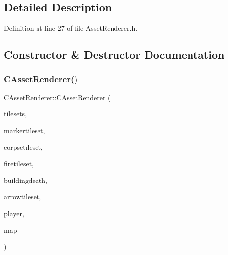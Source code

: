 \subsection{Detailed Description}


Definition at line 27 of file Asset\+Renderer.\+h.



\subsection{Constructor \& Destructor Documentation}
\hypertarget{classCAssetRenderer_a8ac3835671efb08a1793b2fe5af2b187}{}\label{classCAssetRenderer_a8ac3835671efb08a1793b2fe5af2b187} 
\subsubsection{\texorpdfstring{C\+Asset\+Renderer()}{CAssetRenderer()}}
{\footnotesize\ttfamily C\+Asset\+Renderer\+::\+C\+Asset\+Renderer (\begin{DoxyParamCaption}\item[{std\+::vector$<$ std\+::shared\+\_\+ptr$<$ \hyperlink{classCGraphicMulticolorTileset}{C\+Graphic\+Multicolor\+Tileset} $>$ $>$}]{tilesets,  }\item[{std\+::shared\+\_\+ptr$<$ \hyperlink{classCGraphicTileset}{C\+Graphic\+Tileset} $>$}]{markertileset,  }\item[{std\+::shared\+\_\+ptr$<$ \hyperlink{classCGraphicTileset}{C\+Graphic\+Tileset} $>$}]{corpsetileset,  }\item[{std\+::vector$<$ std\+::shared\+\_\+ptr$<$ \hyperlink{classCGraphicTileset}{C\+Graphic\+Tileset} $>$ $>$}]{firetileset,  }\item[{std\+::shared\+\_\+ptr$<$ \hyperlink{classCGraphicTileset}{C\+Graphic\+Tileset} $>$}]{buildingdeath,  }\item[{std\+::shared\+\_\+ptr$<$ \hyperlink{classCGraphicTileset}{C\+Graphic\+Tileset} $>$}]{arrowtileset,  }\item[{std\+::shared\+\_\+ptr$<$ \hyperlink{classCPlayerData}{C\+Player\+Data} $>$}]{player,  }\item[{std\+::shared\+\_\+ptr$<$ \hyperlink{classCAssetDecoratedMap}{C\+Asset\+Decorated\+Map} $>$}]{map }\end{DoxyParamCaption})}



